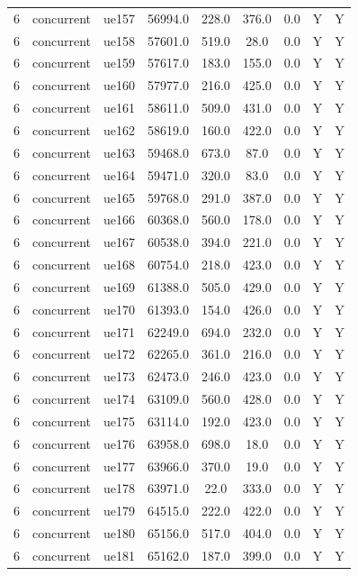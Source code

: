 \begin{table}[ht]
\begin{tabular}{|c|c|c|c|c|c|c|c|c|}
6 & concurrent & ue157 & 56994.0 & 228.0 & 376.0 & 0.0 & Y & Y \\
6 & concurrent & ue158 & 57601.0 & 519.0 & 28.0 & 0.0 & Y & Y \\
6 & concurrent & ue159 & 57617.0 & 183.0 & 155.0 & 0.0 & Y & Y \\
6 & concurrent & ue160 & 57977.0 & 216.0 & 425.0 & 0.0 & Y & Y \\
6 & concurrent & ue161 & 58611.0 & 509.0 & 431.0 & 0.0 & Y & Y \\
6 & concurrent & ue162 & 58619.0 & 160.0 & 422.0 & 0.0 & Y & Y \\
6 & concurrent & ue163 & 59468.0 & 673.0 & 87.0 & 0.0 & Y & Y \\
6 & concurrent & ue164 & 59471.0 & 320.0 & 83.0 & 0.0 & Y & Y \\
6 & concurrent & ue165 & 59768.0 & 291.0 & 387.0 & 0.0 & Y & Y \\
6 & concurrent & ue166 & 60368.0 & 560.0 & 178.0 & 0.0 & Y & Y \\
6 & concurrent & ue167 & 60538.0 & 394.0 & 221.0 & 0.0 & Y & Y \\
6 & concurrent & ue168 & 60754.0 & 218.0 & 423.0 & 0.0 & Y & Y \\
6 & concurrent & ue169 & 61388.0 & 505.0 & 429.0 & 0.0 & Y & Y \\
6 & concurrent & ue170 & 61393.0 & 154.0 & 426.0 & 0.0 & Y & Y \\
6 & concurrent & ue171 & 62249.0 & 694.0 & 232.0 & 0.0 & Y & Y \\
6 & concurrent & ue172 & 62265.0 & 361.0 & 216.0 & 0.0 & Y & Y \\
6 & concurrent & ue173 & 62473.0 & 246.0 & 423.0 & 0.0 & Y & Y \\
6 & concurrent & ue174 & 63109.0 & 560.0 & 428.0 & 0.0 & Y & Y \\
6 & concurrent & ue175 & 63114.0 & 192.0 & 423.0 & 0.0 & Y & Y \\
6 & concurrent & ue176 & 63958.0 & 698.0 & 18.0 & 0.0 & Y & Y \\
6 & concurrent & ue177 & 63966.0 & 370.0 & 19.0 & 0.0 & Y & Y \\
6 & concurrent & ue178 & 63971.0 & 22.0 & 333.0 & 0.0 & Y & Y \\
6 & concurrent & ue179 & 64515.0 & 222.0 & 422.0 & 0.0 & Y & Y \\
6 & concurrent & ue180 & 65156.0 & 517.0 & 404.0 & 0.0 & Y & Y \\
6 & concurrent & ue181 & 65162.0 & 187.0 & 399.0 & 0.0 & Y & Y \\

\end{tabular}
\end{table}
